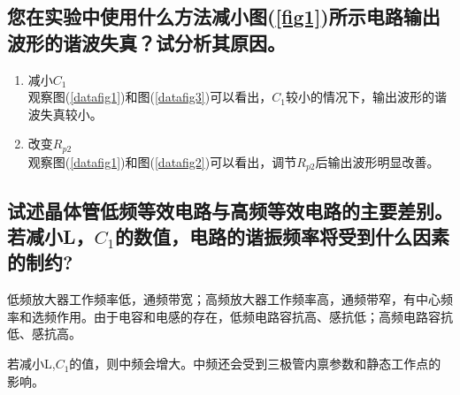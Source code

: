 \documentclass[a4paper]{article}
\begin{document}
\subsection{您在实验中使用什么方法减小图(\ref{fig1})所示电路输出波形的谐波失真？试分析其原因。}
\begin{enumerate}
\item 减小$C_1$\\
观察图(\ref{datafig1})和图(\ref{datafig3})可以看出，$C_1$较小的情况下，输出波形的谐波失真较小。
\item 改变$R_{p2}$\\
观察图(\ref{datafig1})和图(\ref{datafig2})可以看出，调节$R_{p2}$后输出波形明显改善。
\end{enumerate}
\subsection{试述晶体管低频等效电路与高频等效电路的主要差别。若减小L，$C_1$的数值，电路的谐振频率将受到什么因素的制约?}
低频放大器工作频率低，通频带宽；高频放大器工作频率高，通频带窄，有中心频率和选频作用。由于电容和电感的存在，低频电路容抗高、感抗低；高频电路容抗低、感抗高。

若减小L,$C_1$的值，则中频会增大。中频还会受到三极管内禀参数和静态工作点的影响。

\nocite{jiaocai}

\end{document}
